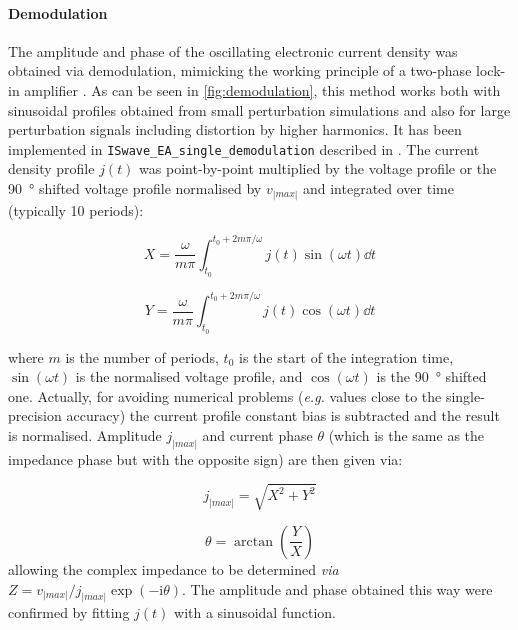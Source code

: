 	\paragraph{Demodulation}
	The amplitude and phase of the oscillating electronic current density was obtained via
	demodulation, mimicking the working principle of a two-phase lock-in amplifier \cite{WikipediaLockIn}.
	As can be seen in \cref{fig:demodulation}, this method works both with sinusoidal profiles obtained from small perturbation simulations and also for large perturbation signals including distortion by higher harmonics.
	It has been implemented in \texttt{ISwave\_EA\_single\_demodulation} described in .
	The current density profile $j(t)$ was point-by-point multiplied by the voltage profile or the \SI{90}{\degree} shifted
	voltage profile normalised by $v_|max|$ and integrated over time (typically 10 periods):

	\begin{equation}
		X = \frac{\omega}{m \pi} \int_{t_0}^{t_0+2m\pi / \omega} j(t) \sin(\omega t) \dd t
	\end{equation}

	\begin{equation}
		Y = \frac{\omega}{m \pi} \int_{t_0}^{t_0+2m\pi / \omega} j(t) \cos(\omega t) \dd t
	\end{equation}

	where $m$ is the number of periods, $t_0$ is the start of the integration time, $\sin(\omega t)$ is the normalised voltage profile, and $\cos(\omega t)$ is the \SI{90}{\degree} shifted one.
	Actually, for avoiding numerical problems (\textsl{e.g.} values close to the single\hyp{}precision accuracy) the current profile constant bias is subtracted and the result is normalised.
	Amplitude $j_|max|$ and current phase $\theta$ (which is the same as the impedance phase but with the opposite sign) are then given via:

	\begin{equation}
		j_|max| = \sqrt{X^2 + Y^2}
	\end{equation}

	\begin{equation}
		\theta = \arctan(\frac{Y}{X})
	\end{equation}
	allowing the complex impedance to be determined \textsl{via} $Z = v_|max| / j_|max| \exp(-\mathrm{i}\theta)$.
	The amplitude and phase	obtained this way were confirmed by fitting $j(t)$ with a sinusoidal function.
	
	
